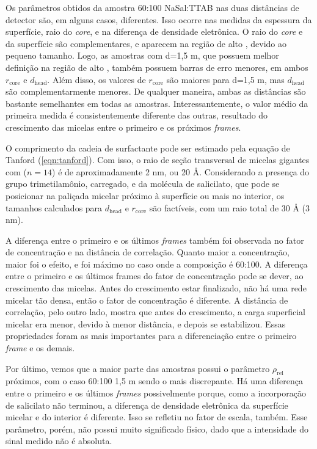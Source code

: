 	Os parâmetros obtidos da amostra 60:100 NaSal:TTAB nas duas distâncias de detector são, em alguns casos, diferentes. Isso ocorre nas medidas da espessura da superfície, raio do \emph{core}, e na diferença de densidade eletrônica. O raio do \emph{core} e da superfície são complementares, e aparecem na região de alto \q, devido ao pequeno tamanho. Logo, as amostras com d=1,5 m, que possuem melhor definição na região de alto \q, também possuem barras de erro menores, em ambos \(r_{\mathrm{core}}\) e \(d_{\mathrm{head}}\). Além disso, os valores de \(r_{\mathrm{core}}\) são maiores para d=1,5 m, mas \(d_\mathrm{head}\) são complementarmente menores. De qualquer maneira, ambas as distâncias são bastante semelhantes em todas as amostras. Interessantemente, o valor médio da primeira medida é consistentemente diferente das outras, resultado do crescimento das micelas entre o primeiro e os próximos \emph{frames}.
	
	O comprimento da cadeia de surfactante pode ser estimado pela equação de Tanford (\autoref{eqn:tanford}). Com isso, o raio de seção transversal de micelas gigantes com \TTAB{} (\(n=14\)) é de aproximadamente 2 nm, ou 20 \AA. Considerando a presença do grupo trimetilamônio, carregado, e da molécula de salicilato, que pode se posicionar na paliçada micelar próximo à superfície ou mais no interior, os tamanhos calculados para \(d_{\mathrm{head}}\) e \(r_{\mathrm{core}}\) são factíveis, com um raio total de 30 \AA{} (3 nm).

	A diferença entre o primeiro e os últimos \emph{frames} também foi observada no fator de concentração e na distância de correlação. Quanto maior a concentração, maior foi o efeito, e foi máximo no caso onde a composição é 60:100. A diferença entre o primeiro e os últimos frames do fator de concentração pode se dever, ao crescimento das micelas. Antes do crescimento estar finalizado, não há uma rede micelar tão densa, então o fator de concentração é diferente. A distância de correlação, pelo outro lado, mostra que antes do crescimento, a carga superficial micelar era menor, devido à menor distância, e depois se estabilizou. Essas propriedades foram as mais importantes para a diferenciação entre o primeiro \emph{frame} e os demais.
	
	Por último, vemos que a maior parte das amostras possui o parâmetro \(\rho_{\mathrm{rel}}\) próximos, com o caso 60:100 1,5 m sendo o mais discrepante. Há uma diferença entre o primeiro e os últimos \emph{frames} possivelmente porque, como a incorporação de salicilato não terminou, a diferença de densidade eletrônica da superfície micelar e do interior é diferente. Isso se refletiu no fator de escala, também. Esse parâmetro, porém, não possui muito significado físico, dado que a intensidade do sinal medido não é absoluta.
	
